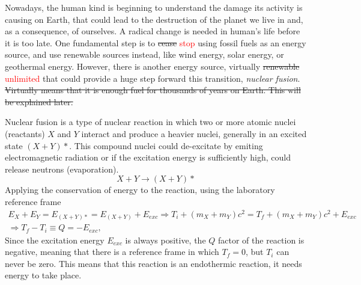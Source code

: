 \documentclass[a4paper,12pt,oneside]{book}
\begin{document}
Nowadays, the human kind is beginning to understand the damage its activity is causing on Earth, that could lead to the destruction of the planet we live in and, as a consequence, of ourselves. A radical change is needed in human's life before it is too late. One fundamental step is to \st{cease} \textcolor{red}{stop} using fossil fuels as an energy source, and  use renewable sources instead, like wind energy, solar energy, or geothermal energy. However, there is another energy source, virtually \st{renewable} \textcolor{red}{unlimited} that could provide a huge step forward this transition,  \textit{nuclear fusion}. \st{Virtually means that it is enough fuel for thousands of years on Earth. This will be explained later.}

Nuclear fusion is a type of nuclear reaction in which two or more atomic nuclei (reactants) $X$ and $Y$ interact and produce a heavier nuclei, generally in an excited state $(X+Y)*$. This compound nuclei could de-excitate by emiting electromagnetic radiation or if the excitation energy is sufficiently high, could release neutrons (evaporation).
%
\begin{equation}
X+Y \rightarrow (X+Y)*
\end{equation}
%
Applying the conservation of energy to the reaction, using the laboratory reference frame
%
\begin{equation}
	\left.
	\begin{array}{c}
E_X+E_Y=E_{(X+Y)*}=E_{(X+Y)}+E_{exc} \Rightarrow T_i+(m_X+m_Y)c^2=T_f+(m_X+m_Y)c^2 +E_{exc} \\ 
\Rightarrow T_f-T_i \equiv Q =-E_{exc},
\end{array}
\right.
\end{equation}
Since the excitation energy $E_{exc}$ is always positive, the $Q$ factor of the reaction is negative, meaning that there is a reference frame in which $T_f=0$, but $T_i$ can never be zero. This means that this reaction is an endothermic reaction, it needs energy to take place.
\end{document}
